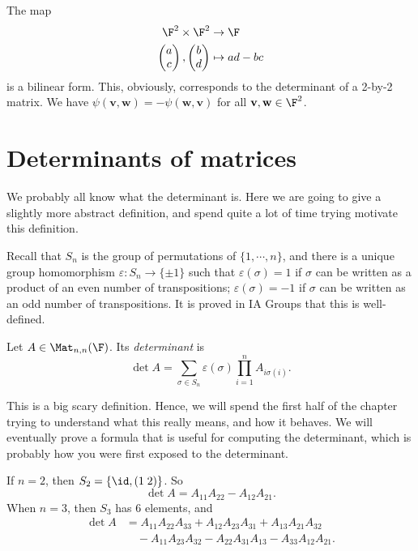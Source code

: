 \documentclass[a4paper]{article}
\begin{document}
\begin{eg}
  The map
  \begin{align*}
    \F^2 \times \F^2 &\to \F\\
    \begin{pmatrix}
      a\\c
    \end{pmatrix},
    \begin{pmatrix}
      b\\d
    \end{pmatrix} &\mapsto ad - bc
  \end{align*}
  is a bilinear form. This, obviously, corresponds to the determinant of a 2-by-2 matrix. We have $\psi(\mathbf{v}, \mathbf{w}) = -\psi(\mathbf{w}, \mathbf{v})$ for all $\mathbf{v}, \mathbf{w}\in \F^2$.
\end{eg}

\section{Determinants of matrices}
We probably all know what the determinant is. Here we are going to give a slightly more abstract definition, and spend quite a lot of time trying motivate this definition.

Recall that $S_n$ is the group of permutations of $\{1, \cdots, n\}$, and there is a unique group homomorphism $\varepsilon: S_n \to \{\pm 1\}$ such that $\varepsilon(\sigma) = 1$ if $\sigma$ can be written as a product of an even number of transpositions; $\varepsilon(\sigma) = -1$ if $\sigma$ can be written as an odd number of transpositions. It is proved in IA Groups that this is well-defined.

\begin{defi}[Determinant]
  Let $A \in \Mat_{n, n}(\F)$. Its \emph{determinant} is
  \[
    \det A = \sum_{\sigma \in S_n} \varepsilon(\sigma) \prod_{i = 1}^n A_{i \sigma(i)}.
  \]
\end{defi}
This is a big scary definition. Hence, we will spend the first half of the chapter trying to understand what this really means, and how it behaves. We will eventually prove a formula that is useful for computing the determinant, which is probably how you were first exposed to the determinant.

\begin{eg}
  If $n = 2$, then $S_2 = \{\id, (1\; 2)\}$. So
  \[
    \det A = A_{11}A_{22} - A_{12} A_{21}.
  \]
  When $n = 3$, then $S_3$ has 6 elements, and
  \begin{align*}
    \det A &= A_{11}A_{22}A_{33} + A_{12}A_{23}A_{31} + A_{13}A_{21}A_{32}\\
    &\quad - A_{11}A_{23}A_{32} - A_{22}A_{31}A_{13} - A_{33}A_{12}A_{21}.
  \end{align*}
\end{eg}
\end{document}
